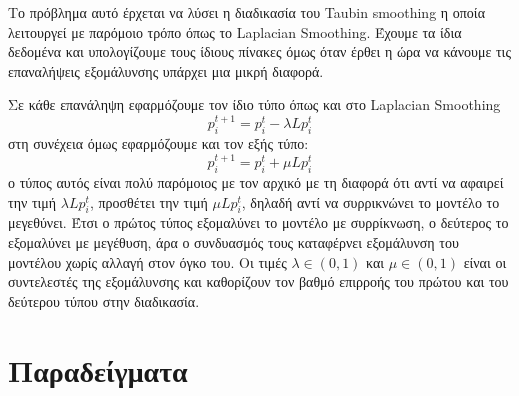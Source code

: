 \documentclass{article}
\begin{document}
Το πρόβλημα αυτό έρχεται να λύσει η διαδικασία του Taubin smoothing η οποία λειτουργεί
με παρόμοιο τρόπο όπως το Laplacian Smoothing. Έχουμε τα ίδια δεδομένα και υπολογίζουμε
τους ίδιους πίνακες όμως όταν έρθει η ώρα να κάνουμε τις επαναλήψεις εξομάλυνσης
υπάρχει μια μικρή διαφορά.

Σε κάθε επανάληψη εφαρμόζουμε τον ίδιο τύπο όπως και στο Laplacian Smoothing
\[p_i^{t+1} = p_i^{t} - \lambda Lp_i^{t}\]
στη συνέχεια όμως εφαρμόζουμε και τον εξής τύπο:
\[p_i^{t+1} = p_i^{t} + \mu Lp_i^{t}\]
ο τύπος αυτός είναι πολύ παρόμοιος με τον αρχικό με τη διαφορά ότι αντί να αφαιρεί την
τιμή $\lambda Lp_i^{t}$, προσθέτει την τιμή $\mu Lp_i^{t}$, δηλαδή αντί να συρρικνώνει
το μοντέλο το μεγεθύνει. Έτσι ο πρώτος τύπος εξομαλύνει το μοντέλο με συρρίκνωση, ο
δεύτερος το εξομαλύνει με μεγέθυση, άρα ο συνδυασμός τους καταφέρνει εξομάλυνση του
μοντέλου χωρίς αλλαγή στον όγκο του. Οι τιμές $\lambda \in (0, 1)$ και $\mu \in (0, 1)$
είναι οι συντελεστές της εξομάλυνσης και καθορίζουν τον βαθμό επιρροής του πρώτου και
του δεύτερου τύπου στην διαδικασία.

\section{Παραδείγματα}
\end{document}
